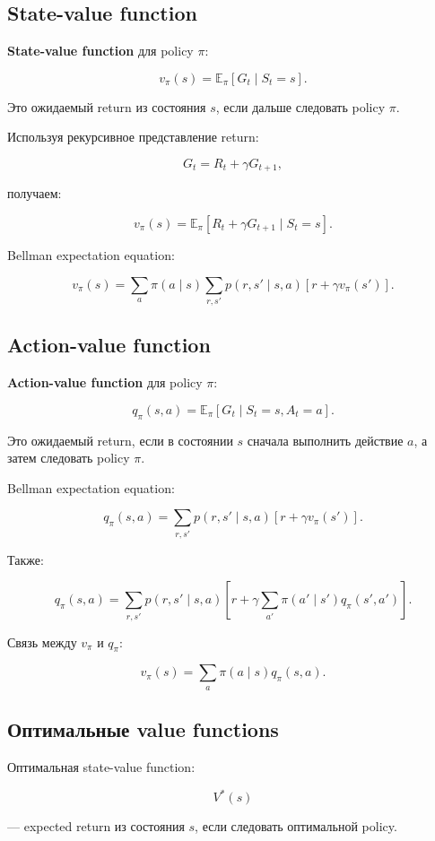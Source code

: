 \documentclass[a4paper,12pt]{article}
\begin{document}
\subsection{State-value function}

\textbf{State-value function} для policy \(\pi\):

\[
v_\pi(s)
=
\mathbb{E}_\pi[G_t \mid S_t=s].
\]

Это ожидаемый return из состояния \(s\), если дальше следовать policy \(\pi\).

Используя рекурсивное представление return:

\[
G_t = R_t + \gamma G_{t+1},
\]

получаем:

\[
v_\pi(s)
=
\mathbb{E}_\pi[R_t + \gamma G_{t+1} \mid S_t=s].
\]

Bellman expectation equation:

\[
v_\pi(s)
=
\sum_a
\pi(a\mid s)
\sum_{r,s'}
p(r,s'\mid s,a)
\left[
r + \gamma v_\pi(s')
\right].
\]

\subsection{Action-value function}

\textbf{Action-value function} для policy \(\pi\):

\[
q_\pi(s,a)
=
\mathbb{E}_\pi[G_t \mid S_t=s, A_t=a].
\]

Это ожидаемый return, если в состоянии \(s\) сначала выполнить действие \(a\), а затем следовать policy \(\pi\).

Bellman expectation equation:

\[
q_\pi(s,a)
=
\sum_{r,s'}
p(r,s'\mid s,a)
\left[
r + \gamma v_\pi(s')
\right].
\]

Также:

\[
q_\pi(s,a)
=
\sum_{r,s'}
p(r,s'\mid s,a)
\left[
r +
\gamma
\sum_{a'}
\pi(a'\mid s')
q_\pi(s',a')
\right].
\]

Связь между \(v_\pi\) и \(q_\pi\):

\[
v_\pi(s)
=
\sum_a
\pi(a\mid s)q_\pi(s,a).
\]

\subsection{Оптимальные value functions}

Оптимальная state-value function:

\[
V^*(s)
\]

--- expected return из состояния \(s\), если следовать оптимальной policy.
\end{document}
